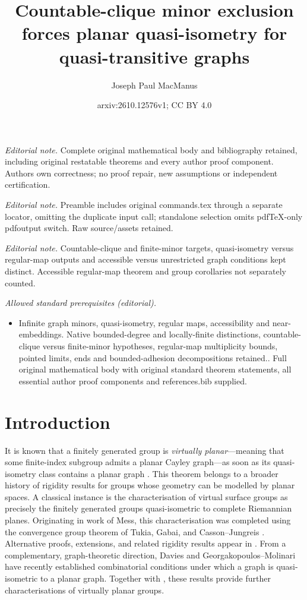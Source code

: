 \documentclass[10pt,a4paper]{amsart}
\title{Countable-clique minor exclusion forces planar quasi-isometry for quasi-transitive graphs}
\author{Joseph Paul MacManus}
\date{arxiv:2610.12576v1; CC BY 4.0}
\theoremstyle{definition}
\begin{document}
\maketitle
\noindent\textit{Editorial note.} Complete original mathematical body and bibliography retained, including original restatable theorems and every author proof component. Authors own correctness; no proof repair, new assumptions or independent certification.\par\medskip
\noindent\textit{Editorial note.} Preamble includes original commands.tex through a separate locator, omitting the duplicate input call; standalone selection omits pdfTeX-only pdfoutput switch. Raw source/assets retained.\par\medskip
\noindent\textit{Editorial note.} Countable-clique and finite-minor targets, quasi-isometry versus regular-map outputs and accessible versus unrestricted graph conditions kept distinct. Accessible regular-map theorem and group corollaries not separately counted.\par\medskip
\noindent\textit{Allowed standard prerequisites (editorial).}\begin{itemize}
\item Infinite graph minors, quasi-isometry, regular maps, accessibility and near-embeddings. Native bounded-degree and locally-finite distinctions, countable-clique versus finite-minor hypotheses, regular-map multiplicity bounds, pointed limits, ends and bounded-adhesion decompositions retained.. Full original mathematical body with original standard theorem statements, all essential author proof components and references.bib supplied.
\end{itemize}\medskip
\section{Introduction}



It is known that a finitely generated group is \emph{virtually planar}---meaning that some finite-index subgroup admits a planar Cayley graph---as soon as its quasi-isometry class contains a planar graph \cite{macmanus2023accessibility}. This theorem belongs to a broader history of rigidity results for groups whose geometry can be modelled by planar spaces. A classical instance is the characterisation of virtual surface groups as precisely the finitely generated groups quasi-isometric to complete Riemannian planes. Originating in work of Mess, this characterisation was completed using the convergence group theorem of Tukia, Gabai, and Casson--Jungreis \cites{mess1988seifert,tukia1988homeomorphic,gabai1992convergence,casson1994convergence}. Alternative proofs, extensions, and related rigidity results appear in \cites{maillot2001quasi,bowditch2004planar,papasoglu2005quasi,macmanus2023accessibility,macmanus2024note,macmanus2025fat,macmanus2025vertex,mackay2026almost}. 
From a complementary, graph-theoretic direction, Davies \cite{davies2025string} and Georgakopoulos–Molinari \cite{georgakopoulos2026quasi} have recently established combinatorial conditions under which a graph is quasi-isometric to a planar graph. Together with \cite{macmanus2023accessibility}, these results provide further characterisations of virtually planar groups.
\end{document}
